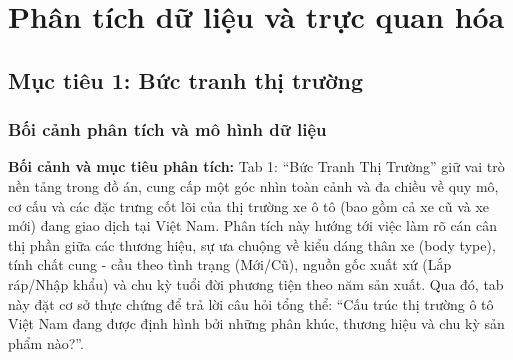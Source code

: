 \section{Phân tích dữ liệu và trực quan hóa}
\label{sec:phan_tich_truc_quan}

\subsection{Mục tiêu 1: Bức tranh thị trường}
\label{subsec:tab1}

\subsubsection{Bối cảnh phân tích và mô hình dữ liệu}
\label{subsubsec:tab1_schema}

\noindent\textbf{Bối cảnh và mục tiêu phân tích:}
Tab 1: ``Bức Tranh Thị Trường'' giữ vai trò nền tảng trong đồ án, cung cấp một góc nhìn toàn cảnh và đa chiều về quy mô, cơ cấu và các đặc trưng cốt lõi của thị trường xe ô tô (bao gồm cả xe cũ và xe mới) đang giao dịch tại Việt Nam. Phân tích này hướng tới việc làm rõ cán cân thị phần giữa các thương hiệu, sự ưa chuộng về kiểu dáng thân xe (body type), tính chất cung - cầu theo tình trạng (Mới/Cũ), nguồn gốc xuất xứ (Lắp ráp/Nhập khẩu) và chu kỳ tuổi đời phương tiện theo năm sản xuất. Qua đó, tab này đặt cơ sở thực chứng để trả lời câu hỏi tổng thể: ``Cấu trúc thị trường ô tô Việt Nam đang được định hình bởi những phân khúc, thương hiệu và chu kỳ sản phẩm nào?''.

